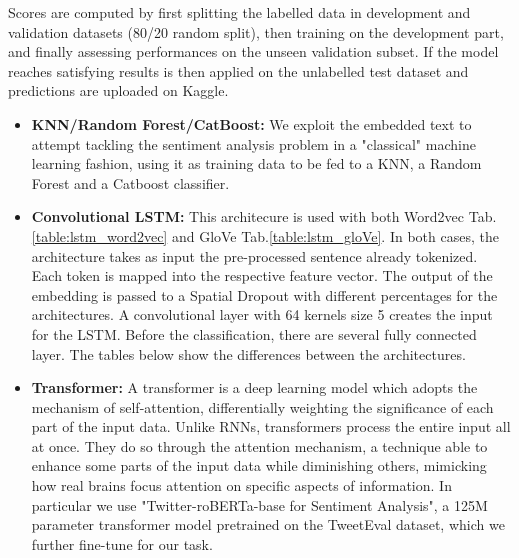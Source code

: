 \documentclass{article}
\begin{document}
    Scores are computed by first splitting the labelled data in development and validation datasets (80/20 random split), then training on the development part, and finally assessing performances on the unseen validation subset. If the model reaches satisfying results is then applied on the unlabelled test dataset and predictions are uploaded on Kaggle.
	\begin{itemize}
		\item \textbf{KNN/Random Forest/CatBoost:} We exploit the embedded text to attempt tackling the sentiment analysis problem in a "classical" machine learning fashion, using it as training data to be fed to a KNN, a Random Forest and a Catboost classifier.
		\item \textbf{Convolutional LSTM:} This architecure is used with both Word2vec Tab.\ref{table:lstm_word2vec} and GloVe Tab.\ref{table:lstm_gloVe}. In both cases, the architecture takes as input the pre-processed sentence already tokenized. Each token is mapped into the respective feature vector. The output of the embedding is passed to a Spatial Dropout with different percentages for the architectures. A convolutional layer with 64 kernels size 5 creates the input for the LSTM. Before the classification, there are several fully connected layer. The tables below show the differences between the architectures.
		\item \textbf{Transformer:} A transformer is a deep learning model which adopts the mechanism of self-attention, differentially weighting the significance of each part of the input data. Unlike RNNs, transformers process the entire input all at once. They do so through the attention mechanism, a technique able to enhance some parts of the input data while diminishing others, mimicking how real brains focus attention on specific aspects of information. In particular we use  "Twitter-roBERTa-base for Sentiment Analysis", a 125M parameter transformer model pretrained on the TweetEval dataset\cite{Chefer_2021_CVPR}, which we further fine-tune for our task.
	\end{itemize}
\end{document}
